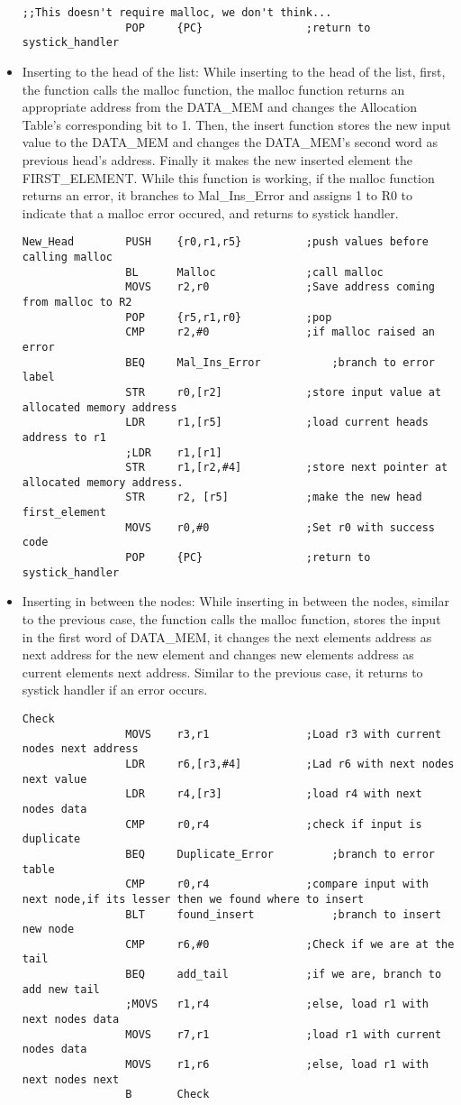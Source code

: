 \documentclass[pdftex,12pt,a4paper]{article}
\begin{document}
\begin{itemize}
\begin{lstlisting}[caption=Inserting to an empty list, style=customasm]
				;;This doesn't require malloc, we don't think...
				POP		{PC}				;return to systick_handler
    \end{lstlisting}
    \item Inserting to the head of the list: While inserting to the head of the list, first, the function calls the malloc function, the malloc function returns an appropriate address from the DATA\_MEM and changes the Allocation Table's corresponding bit to 1. Then, the insert function stores the new input value to the DATA\_MEM and changes the DATA\_MEM's second word as previous head's address. Finally it makes the new inserted element the FIRST\_ELEMENT. While this function is working, if the malloc function returns an error, it branches to Mal\_Ins\_Error and assigns 1 to R0 to indicate that a malloc error occured, and returns to systick handler.
    \newpage
    \begin{lstlisting}[caption=Inserting before the head of the list, style=customasm]
    New_Head		PUSH	{r0,r1,r5}			;push values before calling malloc
				BL		Malloc				;call malloc
				MOVS	r2,r0				;Save address coming from malloc to R2
				POP		{r5,r1,r0}			;pop
				CMP		r2,#0				;if malloc raised an error
				BEQ		Mal_Ins_Error			;branch to error label
				STR		r0,[r2]				;store input value at allocated memory address
				LDR		r1,[r5]				;load current heads address to r1
				;LDR	r1,[r1]
				STR		r1,[r2,#4]			;store next pointer at allocated memory address.
				STR 	r2, [r5]			;make the new head first_element
				MOVS	r0,#0				;Set r0 with success code
				POP		{PC}				;return to systick_handler
    \end{lstlisting}
    \item Inserting in between the nodes: While inserting in between the nodes, similar to the previous case, the function calls the malloc function, stores the input in the first word of DATA\_MEM, it changes the next elements address as next address for the new element and changes new elements address as current elements next address. Similar to the previous case, it returns to systick handler if an error occurs.
    \begin{lstlisting}[caption=Inserting in between the list, style=customasm]
    Check			
				MOVS	r3,r1				;Load r3 with current nodes next address
				LDR		r6,[r3,#4]			;Lad r6 with next nodes next value
				LDR		r4,[r3]				;load r4 with next nodes data
				CMP		r0,r4				;check if input is duplicate
				BEQ		Duplicate_Error			;branch to error table
				CMP		r0,r4				;compare input with next node,if its lesser then we found where to insert
				BLT		found_insert			;branch to insert new node
				CMP		r6,#0				;Check if we are at the tail
				BEQ		add_tail			;if we are, branch to add new tail
				;MOVS	r1,r4				;else, load r1 with next nodes data
				MOVS	r7,r1				;load r1 with current nodes data
				MOVS	r1,r6				;else, load r1 with next nodes next
				B		Check		


\end{lstlisting}
\end{itemize}
\end{document}
